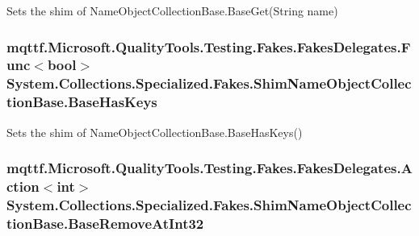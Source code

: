 Sets the shim of Name\-Object\-Collection\-Base.\-Base\-Get(\-String name)

\hypertarget{class_system_1_1_collections_1_1_specialized_1_1_fakes_1_1_shim_name_object_collection_base_ab429ce884fffa7c3e6d25d91f1a049c0}{
\subsubsection[{Base\-Has\-Keys}]{\setlength{\rightskip}{0pt plus 5cm}mqttf.\-Microsoft.\-Quality\-Tools.\-Testing.\-Fakes.\-Fakes\-Delegates.\-Func$<$bool$>$ System.\-Collections.\-Specialized.\-Fakes.\-Shim\-Name\-Object\-Collection\-Base.\-Base\-Has\-Keys\hspace{0.3cm}{\ttfamily [set]}}}\label{class_system_1_1_collections_1_1_specialized_1_1_fakes_1_1_shim_name_object_collection_base_ab429ce884fffa7c3e6d25d91f1a049c0}


Sets the shim of Name\-Object\-Collection\-Base.\-Base\-Has\-Keys()

\hypertarget{class_system_1_1_collections_1_1_specialized_1_1_fakes_1_1_shim_name_object_collection_base_a9b78b1318edf930e3b4d7e343fd6f65a}{
\subsubsection[{Base\-Remove\-At\-Int32}]{\setlength{\rightskip}{0pt plus 5cm}mqttf.\-Microsoft.\-Quality\-Tools.\-Testing.\-Fakes.\-Fakes\-Delegates.\-Action$<$int$>$ System.\-Collections.\-Specialized.\-Fakes.\-Shim\-Name\-Object\-Collection\-Base.\-Base\-Remove\-At\-Int32\hspace{0.3cm}{\ttfamily [set]}}}\label{class_system_1_1_collections_1_1_specialized_1_1_fakes_1_1_shim_name_object_collection_base_a9b78b1318edf930e3b4d7e343fd6f65a}


